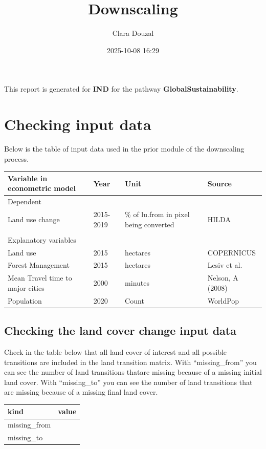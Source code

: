 \documentclass[
]{article}
\title{Downscaling}
\author{Clara Douzal}
\date{2025-10-08 16:29}
\begin{document}
\maketitle

This report is generated for \textbf{IND} for the pathway
\textbf{GlobalSustainability}.

\section{Checking input data}\label{checking-input-data}

Below is the table of input data used in the prior module of the
downscaling process.

\begin{tabular}{l|l|l|l}
\hline
Variable in econometric model & Year & Unit & Source\\
\hline
Dependent &  &  & \\
\hline
Land use change & 2015-2019 & \% of lu.from in pixel being converted & HILDA\\
\hline
 &  &  & \\
\hline
Explanatory variables &  &  & \\
\hline
Land use & 2015 & hectares & COPERNICUS\\
\hline
Forest Management & 2015 & hectares & Lesiv et al.\\
\hline
Mean Travel time to major cities & 2000 & minutes & Nelson, A (2008)\\
\hline
Population & 2020 & Count & WorldPop\\
\hline
\end{tabular}

\subsection{Checking the land cover change input
data}\label{checking-the-land-cover-change-input-data}

Check in the table below that all land cover of interest and all
possible transitions are included in the land transition matrix. With
``missing\_from'' you can see the number of land transitions thatare
missing because of a missing initial land cover. With ``missing\_to''
you can see the number of land transitions that are missing because of a
missing final land cover.

\begin{longtable}[]{@{}ll@{}}
\toprule\noalign{}
kind & value \\
\midrule\noalign{}
\endhead
\bottomrule\noalign{}
\endlastfoot
missing\_from & \\
missing\_to & \\
\end{longtable}
\end{document}
